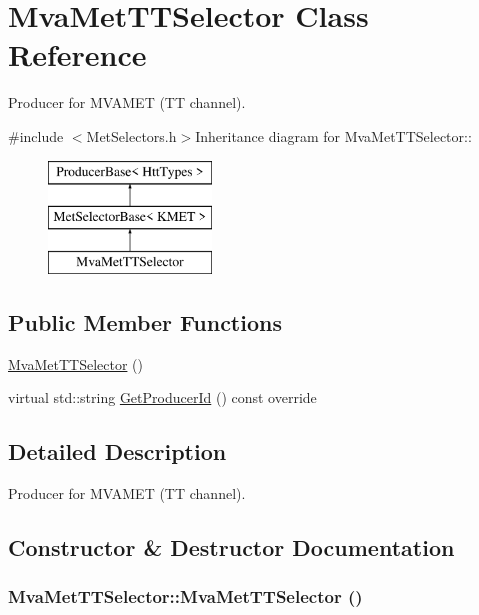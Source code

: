 \hypertarget{classMvaMetTTSelector}{
\section{MvaMetTTSelector Class Reference}
\label{classMvaMetTTSelector}
}


Producer for MVAMET (TT channel).  


{\ttfamily \#include $<$MetSelectors.h$>$}Inheritance diagram for MvaMetTTSelector::\begin{figure}[H]
\begin{center}
\leavevmode
\includegraphics[height=3cm]{classMvaMetTTSelector}
\end{center}
\end{figure}
\subsection*{Public Member Functions}
\begin{DoxyCompactItemize}
\item 
\hyperlink{classMvaMetTTSelector_a629d55e1ff65a4686609f20926fcc313}{MvaMetTTSelector} ()
\item 
virtual std::string \hyperlink{classMvaMetTTSelector_a37ef7c582dbd436af3cb76f34677960a}{GetProducerId} () const override
\end{DoxyCompactItemize}


\subsection{Detailed Description}
Producer for MVAMET (TT channel). 

\subsection{Constructor \& Destructor Documentation}
\hypertarget{classMvaMetTTSelector_a629d55e1ff65a4686609f20926fcc313}{
\subsubsection[{MvaMetTTSelector}]{\setlength{\rightskip}{0pt plus 5cm}MvaMetTTSelector::MvaMetTTSelector ()}}
\label{classMvaMetTTSelector_a629d55e1ff65a4686609f20926fcc313}


